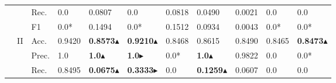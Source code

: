 \begin{tabular}{cclllllllll}
                                                                                                               &                                   & Rec.                                                 & 0.0                     & 0.0807                  & 0.0                          & 0.0818                  & 0.0490                                                                       & 0.0021                                                                      & 0.0                                       & 0.0                                       \\
                                                                                                               &                                   & F1                                                   & 0.0*                    & 0.1494                  & 0.0*                         & 0.1512                  & 0.0934                                                                       & 0.0043                                                                      & 0.0*                                      & 0.0*                                      \\ 
    \cmidrule{2-11}
                                                                                                               & \multirow{4}{*}{II}               & Acc.                                                 & 0.9420                  & \textbf{0.8573}$\blacktriangle$                 & \textbf{0.9210}$\blacktriangle$               & 0.8468                  & 0.8615                                                                       & 0.8490                                                                      & 0.8465                                    & \textbf{0.8473}$\blacktriangle$                          \\
                                                                                                               &                                   & Prec.                                                & 1.0                     & \textbf{1.0}$\blacktriangle$                    & \textbf{1.0}$\blacktriangleright$                  & 0.0*                    & \textbf{1.0}$\blacktriangle$                                                                & 0.9822                                                                      & 0.0                                       & 0.0*                                      \\
                                                                                                               &                                   & Rec.                                                 & 0.8495                  & \textbf{0.0675}$\blacktriangle$                 & \textbf{0.3333$\blacktriangleright$  }             & 0.0                     & \textbf{0.1259}$\blacktriangle$                                                             & 0.0607                                                                      & 0.0                                       & 0.0                                       \\

\end{tabular}
